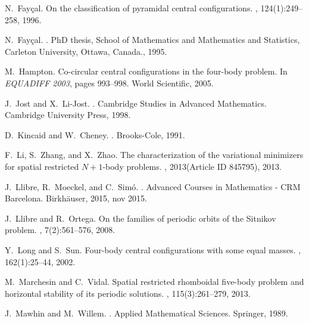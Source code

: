 \documentclass[smallcondensed]{svjour3}
\begin{document}
\begin{thebibliography}{10}
N.~Fay{\c{c}}al.
\newblock On the classification of pyramidal central configurations.
,
  124(1):249--258, 1996.

N.~Fay\c{c}al.
.
\newblock PhD thesis, School of Mathematics and Mathematics and Statistics,
  Carleton University, Ottawa, Canada., 1995.

M.~Hampton.
\newblock Co-circular central configurations in the four-body problem.
\newblock In {\em EQUADIFF 2003}, pages 993--998. World Scientific, 2005.

J.~Jost and X.~Li-Jost.
.
\newblock Cambridge Studies in Advanced Mathematics. Cambridge University
  Press, 1998.

D.~Kincaid and W.~Cheney.
.
\newblock Brooks-Cole, 1991.

F.~Li, S.~Zhang, and X.~Zhao.
\newblock The characterization of the variational minimizers for spatial
  restricted ${N}+1$-body problems.
, 2013(Article ID 845795), 2013.

J.~Llibre, R.~Moeckel, and C.~Sim\'o.
.
\newblock Advanced Courses in Mathematics - CRM Barcelona. Birkh{\"{a}}user,
  2015, nov 2015.

J.~Llibre and R.~Ortega.
\newblock On the families of periodic orbits of the {S}itnikov problem.
, 7(2):561--576, 2008.

Y.~Long and S.~Sun.
\newblock Four-body central configurations with some equal masses.
, 162(1):25--44,
  2002.

M.~Marchesin and C.~Vidal.
\newblock Spatial restricted rhomboidal five-body problem and horizontal
  stability of its periodic solutions.
, 115(3):261--279,
  2013.

J.~Mawhin and M.~Willem.
.
\newblock Applied Mathematical Sciences. Springer, 1989.


\end{thebibliography}
\end{document}
